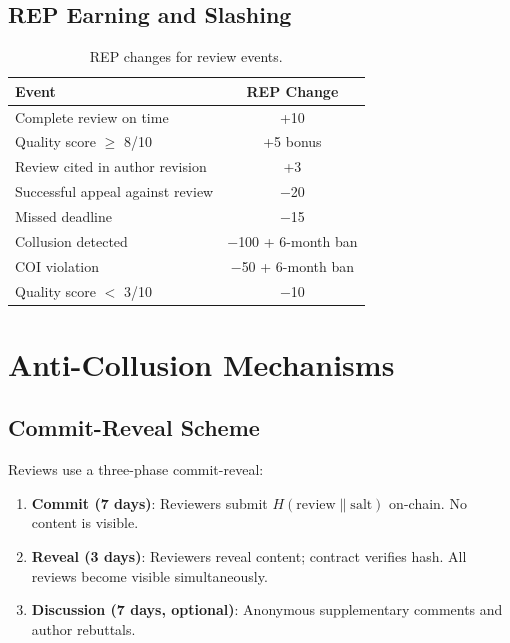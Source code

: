 \documentclass[11pt,letterpaper]{article}
\begin{document}
\subsection{REP Earning and Slashing}

\begin{table}[h]
\centering
\caption{REP changes for review events.}
\label{tab:rep}
\begin{tabular}{lc}
\toprule
\textbf{Event} & \textbf{REP Change} \\
\midrule
Complete review on time & +10 \\
Quality score $\geq$ 8/10 & +5 bonus \\
Review cited in author revision & +3 \\
Successful appeal against review & $-$20 \\
Missed deadline & $-$15 \\
Collusion detected & $-$100 + 6-month ban \\
COI violation & $-$50 + 6-month ban \\
Quality score $<$ 3/10 & $-$10 \\
\bottomrule
\end{tabular}
\end{table}

\section{Anti-Collusion Mechanisms}
\label{sec:collusion}

\subsection{Commit-Reveal Scheme}

Reviews use a three-phase commit-reveal:

\begin{enumerate}
    \item \textbf{Commit (7 days)}: Reviewers submit $H(\text{review} \| \text{salt})$ on-chain. No content is visible.
    \item \textbf{Reveal (3 days)}: Reviewers reveal content; contract verifies hash. All reviews become visible simultaneously.
    \item \textbf{Discussion (7 days, optional)}: Anonymous supplementary comments and author rebuttals.
\end{enumerate}
\end{document}
